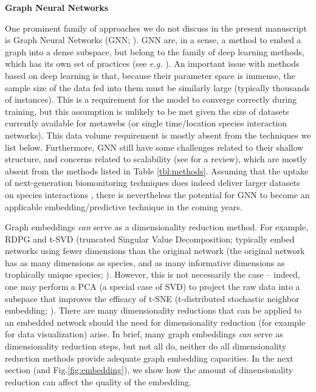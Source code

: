 \begin{summary}
\textbf{Graph Neural Networks}

One prominent family of approaches we do not discuss in the present
manuscript is Graph Neural Networks (GNN; \cite{Zhou2020Graph}). GNN are,
in a sense, a method to embed a graph into a dense subspace, but belong
to the family of deep learning methods, which has its own set of
practices (see \emph{e.g.} \cite{Goodfellow2016Deep}). An important issue with
methods based on deep learning is that, because their parameter space is
immense, the sample size of the data fed into them must be similarly
large (typically thousands of instances). This is a requirement for the
model to converge correctly during training, but this assumption is
unlikely to be met given the size of datasets currently available for
metawebs (or single time/location species interaction networks). This
data volume requirement is mostly absent from the techniques we list
below. Furthermore, GNN still have some challenges related to their
shallow structure, and concerns related to scalability (see
\cite{Gupta2021Graph} for a review), which are mostly absent from the
methods listed in Table \ref{tbl:methods}. Assuming that the uptake of
next-generation biomonitoring techniques does indeed deliver larger
datasets on species interactions \cite{Bohan2017Nextgeneration}, there
is nevertheless the potential for GNN to become an applicable
embedding/predictive technique in the coming years.
\end{summary}

Graph embeddings \emph{can} serve as a dimensionality reduction method.
For example, RDPG \cite{Strydom2022Food} and t-SVD (truncated Singular
Value Decomposition; \cite{Poisot2021Imputing} typically embed networks
using fewer dimensions than the original network (the original network
has as many dimensions as species, and as many informative dimensions as
trophically unique species; \cite{Strydom2021Svd}). However, this is not
necessarily the case -- indeed, one may perform a PCA (a special case of
SVD) to project the raw data into a subspace that improves the efficacy
of t-SNE (t-distributed stochastic neighbor embedding;
\cite{Maaten2009Learning}). There are many dimensionality reductions
\cite{Anowar2021Conceptual} that can be applied to an embedded network
should the need for dimensionality reduction (for example for data
visualization) arise. In brief, many graph embeddings \emph{can} serve
as dimensionality reduction steps, but not all do, neither do all
dimensionality reduction methods provide adequate graph embedding
capacities. In the next section (and Fig.\ref{fig:embedding}), we show how the
amount of dimensionality reduction can affect the quality of the
embedding.

